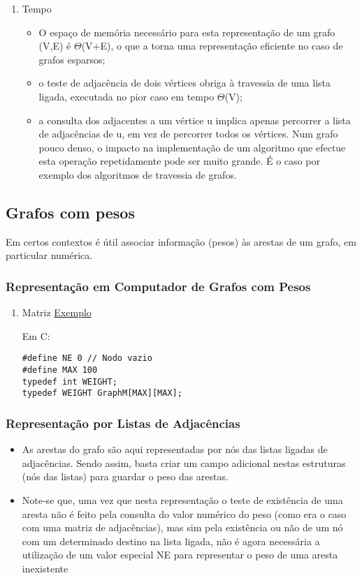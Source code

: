 \documentclass[11pt]{article}
\begin{document}
\begin{enumerate}
\item Tempo
\label{sec:org3437b52}
\begin{itemize}
\item O espaço de memória necessário para esta representação de um grafo (V,E)  é  \(\Theta\)(V+E), o que a torna uma representação eficiente no caso de grafos esparsos;
\item o teste de adjacência de dois vértices obriga à travessia de uma lista ligada, executada no pior caso em tempo \(\Theta\)(V);
\item a consulta dos adjacentes a um vértice u implica apenas percorrer a lista de adjacências de u, em vez de percorrer todos os vértices. Num grafo pouco denso, o impacto na implementação de um algoritmo que efectue esta operação repetidamente pode ser muito grande. É o caso por exemplo dos algoritmos de travessia de grafos.
\end{itemize}
\end{enumerate}

\subsection{Grafos com pesos}
\label{sec:orgdbf9ab6}
Em certos contextos é útil associar informação (pesos) às arestas de um grafo, em particular numérica.
\subsubsection{Representação em Computador de Grafos com Pesos}
\label{sec:orgfca1d0c}
\begin{enumerate}
\item Matriz
\label{sec:orgd139385}
\href{./peso\_grafo.png}{Exemplo}

Em C:
\begin{verbatim}
#define NE 0 // Nodo vazio
#define MAX 100
typedef int WEIGHT;
typedef WEIGHT GraphM[MAX][MAX];
\end{verbatim}
\end{enumerate}
\subsubsection{Representação por Listas de Adjacências}
\label{sec:org25add76}
\begin{itemize}
\item As arestas do grafo são aqui representadas por nós das listas ligadas de adjacências. Sendo assim, basta criar um campo adicional nestas estruturas (nós das listas) para guardar o peso das arestas.

\item Note-se que, uma vez que nesta representação o teste de existência de uma aresta não é feito pela consulta do valor numérico do peso (como era o caso com uma matriz de adjacências), mas sim pela existência ou não de um nó com um determinado destino na lista ligada, não é agora necessária a utilização de um valor especial NE para representar o peso de uma aresta inexistente
\end{itemize}
\end{document}
